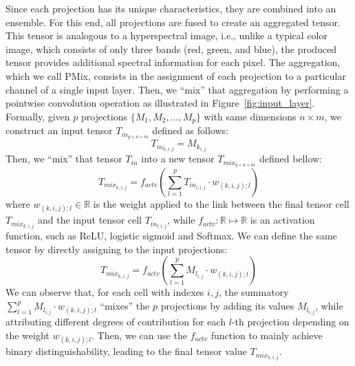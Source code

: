 Since each projection has its unique characteristics, they are combined into an ensemble. For this end, all projections are fused to create an aggregated tensor. This tensor is analogous to a hyperspectral image, i.e., unlike a typical color image, which consists of only three bands (red, green, and blue), the produced tensor provides additional spectral information for each pixel. The aggregation, which we call \gls{PMix}, consists in the assignment of each projection to a particular channel of a single input layer. Then, we ``mix'' that aggregation by performing a pointwise convolution operation as illustrated in Figure~\ref{fig:input_layer}. Formally, given $p$ projections $\{M_1, M_2, ..., M_p\}$ with same dimensions $n \times m$, we construct an input tensor $T_{in_{p \times n \times m}}$ defined as follows:
\begin{equation}
    T_{in_{k,i,j}} = M_{k_{i,j}}
\end{equation}
\noindent Then, we ``mix'' that tensor $T_{in}$ into a new tensor $T_{mix_{q \times n \times m}}$ defined bellow:
\begin{equation}
    T_{mix_{k,i,j}} = f_{actv}\left(\sum\limits_{l=1}^{p}T_{in_{l,i,j}} \cdot w_{(k,i,j);l}\right)
\end{equation} 
\noindent where $w_{(k,i,j);l} \in \mathbb{R}$ is the weight applied to the link between the final tensor cell $T_{mix_{k,i,j}}$ and the input tensor cell $T_{in_{l,i,j}}$, while $f_{actv}: \mathbb{R} \mapsto \mathbb{R}$ is an activation function, such as ReLU, logistic sigmoid and Softmax. We can define the same tensor by directly assigning to the input projections:
\begin{equation}
    \label{eq:mix}
    T_{mix_{k,i,j}} = f_{actv}\left(\sum\limits_{l=1}^{p}M_{l_{i,j}} \cdot w_{(k,i,j);l}\right)
\end{equation}
\noindent We can observe that, for each cell with indexes $i,j$, the summatory $\sum\limits_{l=1}^{p}M_{l_{i,j}} \cdot w_{(k,i,j);l}$ ``mixes'' the $p$ projections by adding its values $M_{l_{i,j}}$, while attributing different degrees of contribution for each $l$-th projection depending on the weight $w_{(k,i,j);l}$. Then, we can use the $f_{actv}$ function to mainly achieve binary distinguishability, leading to the final tensor value $T_{mix_{k,i,j}}$. 





